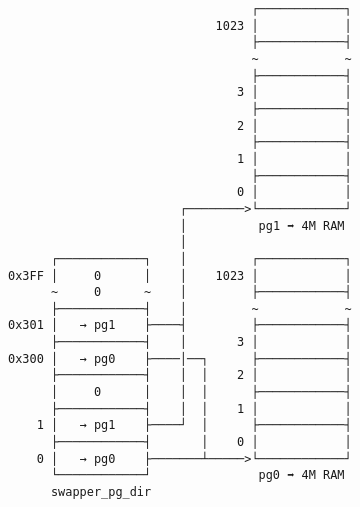 \documentclass[varwidth=40em]{standalone}
\begin{document}
\begin{verbatim}
                                  ┌────────────┐
                             1023 │            │
                                  ├────────────┤
                                  ~            ~
                                  ├────────────┤
                                3 │            │
                                  ├────────────┤
                                2 │            │
                                  ├────────────┤
                                1 │            │
                                  ├────────────┤
                                0 │            │
                        ┌────────>└────────────┘
                        │          pg1 ➡ 4M RAM
                        │
      ┌────────────┐    │         ┌────────────┐
0x3FF │     0      │    │    1023 │            │
      ~     0      ~    │         ├────────────┤
      ├────────────┤    │         ~            ~
0x301 │   → pg1    ├────┤         ├────────────┤
      ├────────────┤    │       3 │            │
0x300 │   → pg0    ├────│──┐      ├────────────┤
      ├────────────┤    │  │    2 │            │
      │     0      │    │  │      ├────────────┤
      ├────────────┤    │  │    1 │            │
    1 │   → pg1    ├────┘  │      ├────────────┤
      ├────────────┤       │    0 │            │
    0 │   → pg0    ├───────┴─────>└────────────┘
      └────────────┘               pg0 ➡ 4M RAM
      swapper_pg_dir
\end{verbatim}
\end{document}
